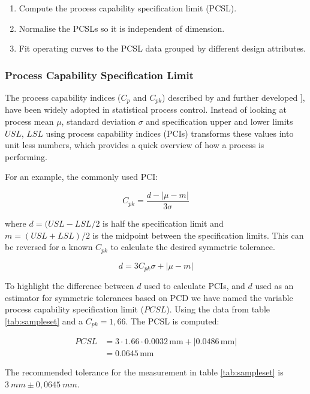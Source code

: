 \documentclass[aip,amsmath, reprint, author-year]{revtex4-1}
\begin{document}
\begin{enumerate}
	\item Compute the process capability specification limit (PCSL). 
	\item Normalise the PCSLs so it is independent of dimension. 
	\item Fit operating curves to the PCSL data grouped by different design attributes. 
\end{enumerate}

\subsubsection{Process Capability Specification Limit}
The process capability indices ($C_p$ and $C_{pk}$) described by \cite{kane1986process} and further developed \citep{wu2009overview}  ], have been widely adopted in statistical process control. Instead of looking at process mean $\mu$, standard deviation $\sigma$ and specification upper and lower limits $USL$, $LSL$ using process capability indices (PCIs) transforms these values into unit less numbers, which provides a quick overview of how a process is performing.

For an example, the commonly used PCI:

\begin{equation}
	C_{pk} = \frac{d - | \mu - m|}{3 \sigma} \nonumber
\end{equation}

where $d = (USL-LSL/2$ is half the specification limit and $m = (USL + LSL)/2$ is the midpoint between the specification limits. This can be reversed for a known $C_{pk}$ to calculate the desired symmetric tolerance.

\begin{equation}
	d = 3 C_{pk} \sigma + | \mu - m|
\end{equation}

To highlight the difference between $d$ used to calculate PCIs, and $d$ used as an estimator for symmetric tolerances based on PCD we have named the variable process capability specification limit ($PCSL$). Using the data from table \ref{tab:sampleset} and a $C_{pk} = 1,66$. The PCSL is computed:

\begin{align*}
PCSL &= 3 \cdot 1.66 \cdot 0.0032 \, \mathrm{mm}
+ |0.0486  \, \mathrm{mm}| \\
&= 0.0645  \, \mathrm{mm}
\end{align*}

The recommended tolerance for the measurement in table  \ref{tab:sampleset}  is $3 \ mm \pm 0,0645 \ mm$. 
\end{document}

